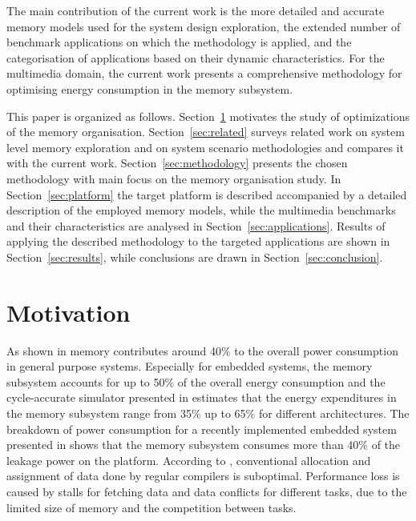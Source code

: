 \documentclass{acm_proc_article-sp}
\begin{document}
The main contribution of the current work 
is the more detailed and accurate memory models used for the system design exploration, the extended number of benchmark applications on which the methodology is applied, and the categorisation of applications based on their dynamic characteristics. For the multimedia domain, the current work presents a comprehensive methodology for optimising energy consumption in the memory subsystem.

This paper is organized as follows. Section~\ref{sec:motivation} motivates the study of optimizations of the memory organisation. Section~\ref{sec:related} surveys related work on system level memory exploration and on system scenario methodologies and compares it with the current work. Section~\ref{sec:methodology} presents the chosen methodology with main focus on the memory organisation study. In Section~\ref{sec:platform} the target platform is described accompanied by a detailed description of the employed memory models, while the multimedia benchmarks and their characteristics are analysed in Section~\ref{sec:applications}. Results of applying the described methodology to the targeted applications are shown in Section~\ref{sec:results}, while conclusions are drawn in Section~\ref{sec:conclusion}. 

\section{Motivation}
\label{sec:motivation}

As shown in \cite{Gonzalez1996} memory contributes around 40\% to the overall power consumption in general purpose systems. Especially for embedded systems, the memory subsystem accounts for up to 50\% of the overall energy consumption \cite{Che09} and the cycle-accurate simulator presented in \cite{Ben99} estimates that the energy expenditures in the memory subsystem range from 35\% up to 65\% for different architectures. The breakdown of power consumption for a recently implemented embedded system presented in \cite{Hul11} shows that the memory subsystem consumes more than 40\% of the leakage power on the platform. According to \cite{tcm}, conventional allocation and assignment of data done by regular compilers is suboptimal. Performance loss is caused by stalls for fetching data and data conflicts for different tasks, due to the limited size of memory and the competition between tasks. 
\end{document}
